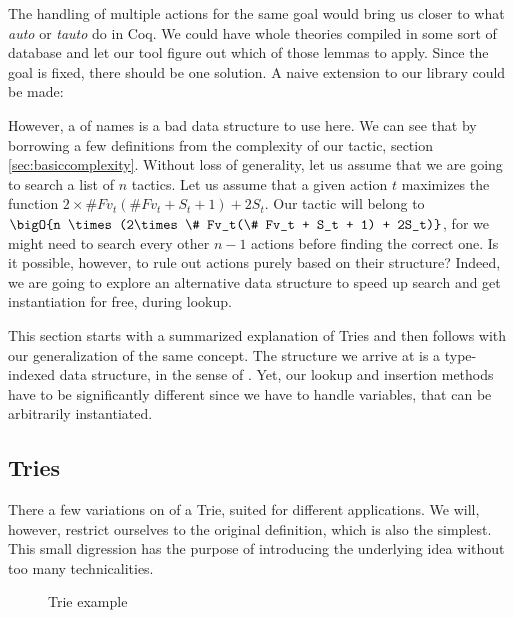 The handling of multiple actions for the same goal would bring us closer to what
\emph{auto} or \emph{tauto} do in Coq. We could have whole theories compiled in some sort
of database and let our tool figure out which of those lemmas to apply. Since the goal is
fixed, there should be one solution. A naive extension to our library could be made:


However, a  of names is a bad data structure to use here. We can see that
by borrowing a few definitions from the complexity of our  tactic, section \ref{sec:basiccomplexity}.
Without loss of generality, let us assume that we are going to search a list of $n$
tactics. Let us assume that a given action $t$ maximizes the function $2\times \# Fv_t(\# Fv_t + S_t + 1) + 2S_t$.
Our  tactic will belong to $\bigO{n \times (2\times \# Fv_t(\# Fv_t + S_t + 1) + 2S_t)}$,
for we might need to search every other $n-1$ actions before finding the correct one.
Is it possible, however, to rule out actions purely based on their structure?
Indeed, we are going to explore an alternative data structure to speed up search and get
instantiation for free, during lookup.

This section starts with a summarized explanation of Tries and then follows with our
generalization of the same concept. The structure we arrive at is a type-indexed data structure,
in the sense of \cite{Hinze04}. Yet, our lookup and insertion methods have to be significantly different
since we have to handle variables, that can be arbitrarily instantiated.

\subsection{Tries}

There a few variations on of a Trie, suited for different applications. We will, however,
restrict ourselves to the original definition, which is also the simplest. This small digression
has the purpose of introducing the underlying idea without too many technicalities.

\begin{wrapfigure}{r}{0.30\textwidth}
\begin{center}
\end{center}
\caption{Trie example}
\label{fig:firsttrie}
\end{wrapfigure}

